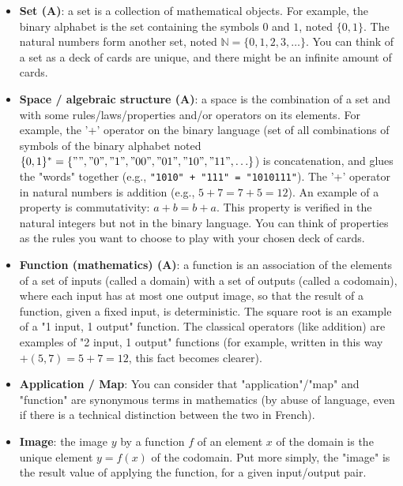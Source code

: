 \documentclass{article}
\begin{document}
\begin{itemize}
    \item \textbf{Set (A)}: a set is a collection of mathematical objects. For example, the binary alphabet is the set containing the symbols $0$ and $1$, noted $\{0, 1\}$. The natural numbers form another set, noted $\mathbb{N} = \{0, 1, 2, 3, \dots\}$. You can think of a set as a deck of cards are unique, and there might be an infinite amount of cards.
    
    \item \textbf{Space / algebraic structure (A)}: a space is the combination of a set and with some rules/laws/properties and/or operators on its elements. For example, the '+' operator on the binary language (set of all combinations of symbols of the binary alphabet noted $\{0, 1\}^* = \{"", "0", "1", "00", "01", \\ "10", "11", \ldots\}$) is concatenation, and glues the "words" together (e.g., \texttt{"1010" + "111" = "1010111"}). The '+' operator in natural numbers is addition (e.g., $5 + 7 = 7 + 5 = 12$). An example of a property is commutativity: $a + b = b + a$. This property is verified in the natural integers but not in the binary language. You can think of properties as the rules you want to choose to play with your chosen deck of cards.
    
    \item \textbf{Function (mathematics) (A)}: a function is an association of the elements of a set of inputs (called a domain) with a set of outputs (called a codomain), where each input has at most one output image, so that the result of a function, given a fixed input, is deterministic. The square root is an example of a "1 input, 1 output" function. The classical operators (like addition) are examples of "2 input, 1 output" functions (for example, written in this way $+(5, 7) = 5 + 7 = 12$, this fact becomes clearer).
    
    \item \textbf{Application / Map}: You can consider that "application"/"map" and "function" are synonymous terms in mathematics (by abuse of language, even if there is a technical distinction between the two in French).
    
    \item \textbf{Image}: the image $y$ by a function $f$ of an element $x$ of the domain is the unique element $y = f(x)$ of the codomain. Put more simply, the "image" is the result value of applying the function, for a given input/output pair.
    

\end{itemize}
\end{document}
